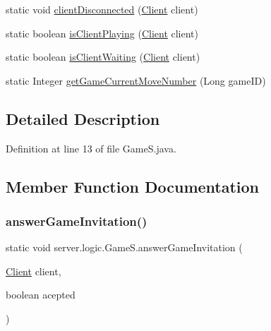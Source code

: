 \begin{DoxyCompactItemize}
\item 
static void \hyperlink{classserver_1_1logic_1_1_game_s_a84e3aec73f199ebdac03d69e5a73a364}{client\+Disconnected} (\hyperlink{classserver_1_1conn_1_1_client}{Client} client)
\item 
static boolean \hyperlink{classserver_1_1logic_1_1_game_s_ad890825fc5720c163f772d810d95e4ff}{is\+Client\+Playing} (\hyperlink{classserver_1_1conn_1_1_client}{Client} client)
\item 
static boolean \hyperlink{classserver_1_1logic_1_1_game_s_a4cacb73ebb00070b5c072bea676e92f8}{is\+Client\+Waiting} (\hyperlink{classserver_1_1conn_1_1_client}{Client} client)
\item 
static Integer \hyperlink{classserver_1_1logic_1_1_game_s_a92e4c9561cc42c2d73027c2ea3596a08}{get\+Game\+Current\+Move\+Number} (Long game\+ID)
\end{DoxyCompactItemize}


\subsection{Detailed Description}


Definition at line 13 of file Game\+S.\+java.



\subsection{Member Function Documentation}
\hypertarget{classserver_1_1logic_1_1_game_s_a6cc95653ec6cfe464226b7d2cf6308de}{}\label{classserver_1_1logic_1_1_game_s_a6cc95653ec6cfe464226b7d2cf6308de} 
\subsubsection{\texorpdfstring{answer\+Game\+Invitation()}{answerGameInvitation()}}
{\footnotesize\ttfamily static void server.\+logic.\+Game\+S.\+answer\+Game\+Invitation (\begin{DoxyParamCaption}\item[{\hyperlink{classserver_1_1conn_1_1_client}{Client}}]{client,  }\item[{boolean}]{acepted }\end{DoxyParamCaption})\hspace{0.3cm}{\ttfamily [static]}}



